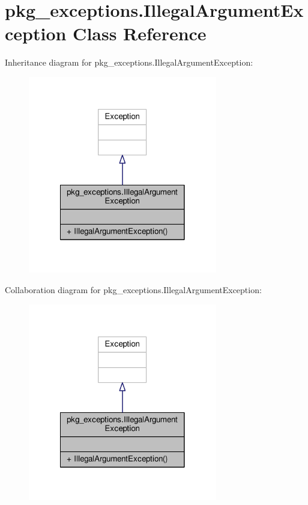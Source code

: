 \hypertarget{classpkg__exceptions_1_1IllegalArgumentException}{\section{pkg\-\_\-exceptions.\-Illegal\-Argument\-Exception Class Reference}
\label{classpkg__exceptions_1_1IllegalArgumentException}
}


Inheritance diagram for pkg\-\_\-exceptions.\-Illegal\-Argument\-Exception\-:
\nopagebreak
\begin{figure}[H]
\begin{center}
\leavevmode
\includegraphics[width=234pt]{classpkg__exceptions_1_1IllegalArgumentException__inherit__graph}
\end{center}
\end{figure}


Collaboration diagram for pkg\-\_\-exceptions.\-Illegal\-Argument\-Exception\-:
\nopagebreak
\begin{figure}[H]
\begin{center}
\leavevmode
\includegraphics[width=234pt]{classpkg__exceptions_1_1IllegalArgumentException__coll__graph}
\end{center}
\end{figure}
